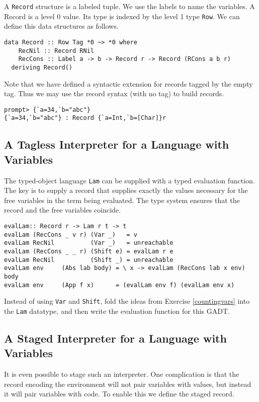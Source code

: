 \documentclass[11pt,twoside,A4]{llncs}
\begin{document}
A {\tt Record} structure is a labeled tuple. We use
the labels to name the variables. A Record is a level 0
value. Its type is indexed by the level 1 type {\tt Row}.
We can define this data structures as follows.

{\small
\begin{verbatim}
data Record :: Row Tag *0 ~> *0 where
    RecNil :: Record RNil
    RecCons :: Label a -> b -> Record r -> Record (RCons a b r)
  deriving Record()
\end{verbatim}}
Note that we have defined a syntactic extension for records tagged by
the empty tag. Thus we may use the record syntax (with no tag) to build
records.

{\small
\begin{verbatim}
prompt> {`a=34,`b="abc"}
{`a=34,`b="abc"} : Record {`a=Int,`b=[Char]}r
\end{verbatim}}

\subsection{A Tagless Interpreter for a Language with Variables}\label{tagglessvars}

The typed-object language {\tt Lam} can be supplied with a typed
evaluation function. The key is to supply a record that supplies exactly
the values necessary for the free variables in the term being evaluated.
The type system ensures that the record and the free variables coincide.

{\small
\begin{verbatim}
evalLam:: Record r -> Lam r t -> t
evalLam (RecCons _ v r) (Var _)   = v
evalLam RecNil          (Var _)   = unreachable
evalLam (RecCons _ _ r) (Shift e) = evalLam r e
evalLam RecNil          (Shift _) = unreachable
evalLam env     (Abs lab body) = \ x -> evalLam (RecCons lab x env) body
evalLam env     (App f x)      = (evalLam env f) (evalLam env x)
\end{verbatim}}

\begin{exercise}
Instead of using {\tt Var} and {\tt Shift}, fold the ideas from Exercise
\ref{countingvars} into the {\tt Lam} datatype, and then write
the evaluation function for this GADT.
\end{exercise}

\subsection{A Staged Interpreter for a Language with Variables}
It is even possible to stage such an interpreter. One complication
is that the record encoding the environment will not
pair variables with values, but instead it will pair variables with code. To enable this
we define the staged record.
\end{document}
